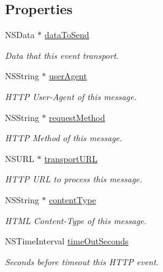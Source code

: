 \subsection*{Properties}
\begin{DoxyCompactItemize}
\item 
\hypertarget{a00012_aa39bdf65fc26801d45dc3d80cc68892b}{
NSData $\ast$ \hyperlink{a00012_aa39bdf65fc26801d45dc3d80cc68892b}{dataToSend}}
\label{a00012_aa39bdf65fc26801d45dc3d80cc68892b}

\begin{DoxyCompactList}\small\item\em Data that this event transport. \item\end{DoxyCompactList}\item 
\hypertarget{a00012_a3c044d1ed331e62473a3ed37bdeadb30}{
NSString $\ast$ \hyperlink{a00012_a3c044d1ed331e62473a3ed37bdeadb30}{userAgent}}
\label{a00012_a3c044d1ed331e62473a3ed37bdeadb30}

\begin{DoxyCompactList}\small\item\em HTTP User-\/Agent of this message. \item\end{DoxyCompactList}\item 
NSString $\ast$ \hyperlink{a00012_a95ef26b022a5d51a8d5ee34bbbb7e399}{requestMethod}
\begin{DoxyCompactList}\small\item\em HTTP Method of this message. \item\end{DoxyCompactList}\item 
\hypertarget{a00012_a13f97267d17f51149120e5142356ac5c}{
NSURL $\ast$ \hyperlink{a00012_a13f97267d17f51149120e5142356ac5c}{transportURL}}
\label{a00012_a13f97267d17f51149120e5142356ac5c}

\begin{DoxyCompactList}\small\item\em HTTP URL to process this message. \item\end{DoxyCompactList}\item 
NSString $\ast$ \hyperlink{a00012_ac9ab3ce00110b03ae50285c1d5b6e03f}{contentType}
\begin{DoxyCompactList}\small\item\em HTML Content-\/Type of this message. \item\end{DoxyCompactList}\item 
NSTimeInterval \hyperlink{a00012_a47d1d71ffd2145a805f29db0e2dcf5ae}{timeOutSeconds}
\begin{DoxyCompactList}\small\item\em Seconds before timeout this HTTP event. \item\end{DoxyCompactList}\end{DoxyCompactItemize}
